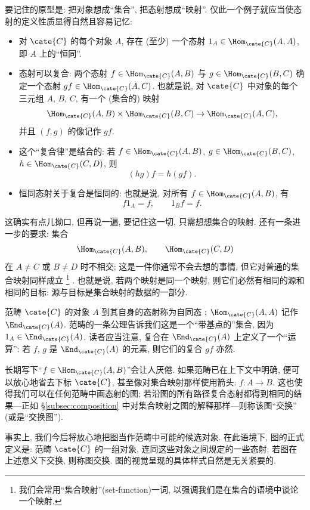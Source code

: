 要记住的原型是: 把对象想成``集合'', 把态射想成``映射''. 仅此一个例子就应当使态射的定义性质显得自然且容易记忆:
\begin{itemize}
	\item 对 $\cate{C}$ 的每个对象 $A$, 存在 (至少) 一个态射 $1_A \in \Hom_{\cate{C}}(A, A)$, 即 $A$ 上的``恒同''.
	\item 态射可以复合: 两个态射 $f \in \Hom_{\cate{C}}(A, B)$ 与 $g \in \Hom_{\cate{C}}(B, C)$ 确定一个态射 $gf \in \Hom_{\cate{C}}(A, C)$. 也就是说, 对 $\cate{C}$ 中对象的每个三元组 $A$, $B$, $C$, 有一个 (集合的) 映射
	\[
	\Hom_{\cate{C}}(A, B) \times \Hom_{\cate{C}}(B, C) \to \Hom_{\cate{C}}(A, C),
	\]
	并且 $(f,g)$ 的像记作 $gf$.
	\item 这个``复合律''是结合的: 若 $f \in \Hom_{\cate{C}}(A, B)$, $g \in \Hom_{\cate{C}}(B, C)$, $h \in \Hom_{\cate{C}}(C, D)$, 则
	\[
	(hg)f = h(gf).
	\]
	\item 恒同态射关于复合是恒同的: 也就是说, 对所有 $f \in \Hom_{\cate{C}}(A, B)$, 有
	\[
	f 1_A = f, \qquad 1_B f = f.
	\]
\end{itemize}
这确实有点儿拗口, 但再说一遍, 要记住这一切, 只需想想集合的映射. 还有一条进一步的要求: 集合
\[
\Hom_{\cate{C}}(A, B), \qquad \Hom_{\cate{C}}(C, D)
\]
在 $A \neq C$ 或 $B \neq D$ 时不相交; 这是一件你通常不会去想的事情, 但它对普通的集合映射同样成立%
\footnote{我们会常用``集合映射''(set-function)一词, 以强调我们是在集合的语境中谈论一个映射.}%
. 也就是说, 若两个映射是同一个映射, 则它们必然有相同的源和相同的目标: 源与目标是集合映射的数据的一部分.

范畴 $\cate{C}$ 的对象 $A$ 到其自身的态射称为自同态%
; $\Hom_{\cate{C}}(A, A)$ 记作 $\End_{\cate{C}}(A)$. 范畴的一条公理告诉我们这是一个``带基点的''集合, 因为 $1_A \in \End_{\cate{C}}(A)$. 读者应当注意, 复合在 $\End_{\cate{C}}(A)$ 上定义了一个``运算'': 若 $f$, $g$ 是 $\End_{\cate{C}}(A)$ 的元素, 则它们的复合 $gf$ 亦然.

长期写下``$f \in \Hom_{\cate{C}}(A, B)$''会让人厌倦. 如果范畴已在上下文中明确, 便可以放心地省去下标 $\cate{C}$, 甚至像对集合映射那样使用箭头: $f : A \to B$. 这也使得我们可以在任何范畴中画态射的图; 若沿图的所有路径复合态射都得到相同的结果---正如 \S\ref{subsec:composition} 中对集合映射之图的解释那样---则称该图``交换'' (或是``交换图'').

事实上, 我们今后将放心地把图当作范畴中可能的候选对象. 在此语境下, 图的正式定义是: 范畴 $\cate{C}$ 的一组对象, 连同这些对象之间规定的一些态射; 若图在上述意义下交换, 则称图交换. 图的视觉呈现的具体样式自然是无关紧要的.

